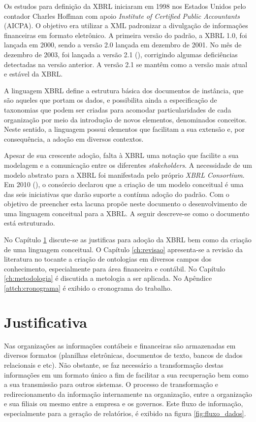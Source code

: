 \documentclass[msc,proposal,hidelot,hideabstract]{ppgccufmg} %
\begin{document}
Os estudos para definição da XBRL iniciaram em 1998 nos Estados Unidos pelo contador Charles Hoffman com apoio \textit{Institute of Certified Public Accountants} (AICPA). O objetivo era utilizar a XML padronizar a divulgação de informações financeiras em formato eletrônico. A primeira versão do padrão, a XBRL 1.0, foi lançada em 2000, sendo a versão 2.0 lançada em dezembro de 2001. No mês de dezembro de 2003, foi lançada a versão 2.1 (\cite{hoffman_2006}), corrigindo algumas deficiências detectadas na versão anterior. A versão 2.1 se mantêm como a versão mais atual e estável da XBRL.

A linguagem XBRL define a estrutura básica dos documentos de instância, que são aqueles que portam os dados, e possibilita ainda a especificação de taxonomias que podem ser criadas para acomodar particularidades de cada organização por meio da introdução de novos elementos, denominados conceitos. Neste sentido, a linguagem possui elementos que facilitam a sua extensão e, por consequência, a adoção em diversos contextos.

Apesar de sua crescente adoção, falta à XBRL uma notação que facilite a sua modelagem e a comunicação entre os diferentes \textit{stakeholders}. A necessidade de um modelo abstrato para a XBRL foi manifestada pelo próprio \textit{XBRL Consortium}. Em 2010 (\cite{xbrl_preserve_promote_particite}), o consórcio declarou que a criação de um modelo conceitual é uma das seis iniciativas que darão suporte a contínua adoção do padrão. Com o objetivo de preencher esta lacuna propõe neste documento o desenvolvimento de uma linguagem conceitual para a XBRL. A seguir descreve-se como o documento está estruturado.

No Capítulo \ref{ch:justificativa} discute-se as justificas para adoção da XBRL bem como da criação de uma linguagem conceitual. O Capítulo \ref{ch:revisao} apresenta-se a revisão da literatura no tocante a criação de ontologias em diversos campos dos conhecimento, especialmente para área financeira e contábil. No Capítulo \ref{ch:metodologia} é discutida a metologia a ser aplicada. No Apêndice \ref{attch:cronograma} é exibido o cronograma do trabalho.

\chapter{Justificativa}
\label{ch:justificativa}

Nas organizações as informações contábeis e financeiras são armazenadas em diversos formatos (planilhas eletrônicas, documentos de texto, bancos de dados relacionais e etc). Não obstante, se faz necessário a transformação destas informações em um formato único a fim de facilitar a sua recuperação bem como a sua transmissão para outros sistemas. O processo de transformação e redirecionamento da informação internamente na organização, entre a organização e sua filiais ou mesmo entre a empresa e os governos. Este fluxo de informação, especialmente para a geração de relatórios, é exibido na figura \ref{fig:fluxo_dados}.
\end{document}
